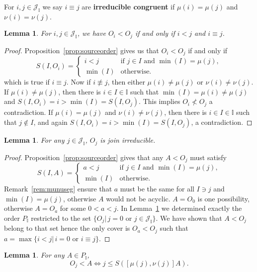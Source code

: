\documentclass[reqno]{amsart}
\newtheorem{lemma}[theorem]{Lemma}
\theoremstyle{definition}
\newcommand{\defn}[1]{\textbf{\textsf{\color{PineGreen} #1}}} %
\newcommand{\II}{\mathbb I} %
\newcommand{\cJ}{\mathcal J} %
\begin{document}
For $i,j\in \cJ_\II$ we say $i\equiv j$ are \defn{irreducible congruent} if $\mu(i)=\mu(j)$ and $\nu(i)=\nu(j)$.

\begin{lemma} \label{lem:irrorder}
 For $i,j\in \cJ_\II$, we have $O_i<O_j$ if and only if $i<j$ and $i\equiv j$.
\end{lemma}

\begin{proof} Proposition~\ref{prop:sourceorder} gives us that $O_i<O_j$ if and only if
 	$$ S(I,O_i)=\begin{cases}
		i<j & \text{if $j\in I$ and $\min(I)=\mu(j)$},\\
		\min(I)& \text{otherwise.}
	\end{cases}$$
which is true if $i\equiv j$. Now if $i\not\equiv j$, then either $\mu(i)\ne \mu(j)$  or  $\nu(i)\ne \nu(j)$.
If $\mu(i)\ne\mu(j)$, then there is $i\in I\in \II$ such that $\min(I)=\mu(i)\ne\mu(j)$ and
  $S(I,O_i)=i>\min(I)=S(I,O_j)$. This implies $O_i\not<O_j$ a contradiction. If $\mu(i)= \mu(j)$  and  $\nu(i)\ne \nu(j)$,
  then there is $i\in I\in \II$ such that $j\not\in I$, and again $S(I,O_i)=i>\min(I)=S(I,O_j)$, a contradiction.
\end{proof} 

\begin{lemma}\label{lem:irrOj}
	For any $j\in \cJ_\II$, $O_j$ is join irreducible.
\end{lemma}

\begin{proof} Proposition~\ref{prop:sourceorder} gives that any $A<O_j$ must satisfy
 	$$ S(I,A)=\begin{cases}
		a<j & \text{if $j\in I$ and $\min(I)=\mu(j)$},\\
		\min(I)& \text{otherwise.}
	\end{cases}$$
Remark~\ref{rem:munuseg} ensure that $a$ must be the same for all $I\ni j$ and $\min(I)=\mu(j)$, otherwise $A$ would not be acyclic.
$A=O_0$ is one possibility, otherwise $A=O_a$ for some $0<a<j$. In Lemma~\ref{lem:irrorder} we determined exactly the order $P_\II$ restricted
to the set $\{ O_j |\, j=0 \text{ or } j\in \cJ_\II\}$. We have shown  that $A<O_j$ belong to that set hence the only cover is $O_a<O_j$
such that $a=\max\{ i<j|\, i=0 \text{ or } i\equiv j\}$.
\end{proof}

\begin{lemma}\label{lem:subirr}
	For any $A\in P_\II$,
	 $$ O_j<A \iff j\le S([\mu(j),\nu(j)] A). $$
\end{lemma}
\end{document}

